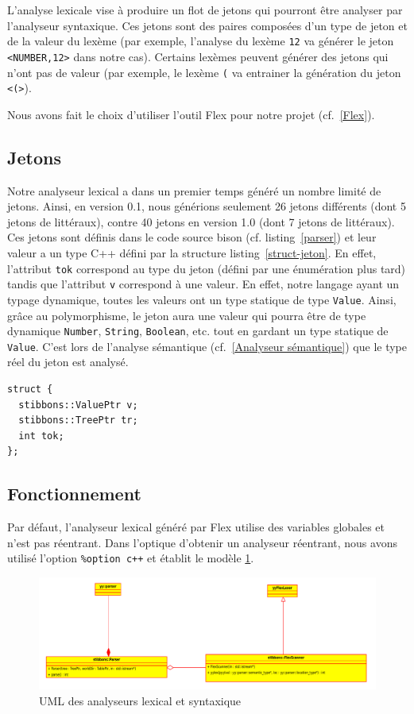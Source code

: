 L'analyse lexicale vise à produire un flot de jetons qui pourront être analyser par l'analyseur syntaxique. Ces jetons sont des paires composées d'un type de jeton et de la valeur du lexème (par exemple, l'analyse du lexème \verb|12| va générer le jeton \verb|<NUMBER,12>| dans notre cas). Certains lexèmes peuvent générer des jetons qui n'ont pas de valeur (par exemple, le lexème \verb|(| va entrainer la génération du jeton \verb|<(>|).

Nous avons fait le choix d'utiliser l'outil Flex pour notre projet (cf.~\ref{Flex}).

\subsection{Jetons}
Notre analyseur lexical a dans un premier temps généré un nombre limité de jetons. Ainsi, en version 0.1, nous générions seulement 26 jetons différents (dont 5 jetons de littéraux), contre 40 jetons en version 1.0 (dont 7 jetons de littéraux). Ces jetons sont définis dans le code source bison (cf. listing~\ref{parser}) et leur valeur a un type C++ défini par la structure listing~\ref{struct-jeton}. En effet, l'attribut \verb|tok| correspond au type du jeton (défini par une énumération plus tard) tandis que l'attribut \verb|v| correspond à une valeur. En effet, notre langage ayant un typage dynamique, toutes les valeurs ont un type statique de type \verb|Value|. Ainsi, grâce au polymorphisme, le jeton aura une valeur qui pourra être de type dynamique \verb|Number|, \verb|String|, \verb|Boolean|, etc. tout en gardant un type statique de \verb|Value|. C'est lors de l'analyse sémantique (cf.~\ref{Analyseur sémantique}) que le type réel du jeton est analysé.

\begin{lstlisting}[label=struct-jeton,caption=Type des valeurs des jetons]
struct {
  stibbons::ValuePtr v;
  stibbons::TreePtr tr;
  int tok;
};
\end{lstlisting}

\subsection{Fonctionnement}
Par défaut, l'analyseur lexical généré par Flex utilise des variables globales et n'est pas réentrant. Dans l'optique d'obtenir un analyseur réentrant, nous avons utilisé l'option \verb|%option c++| et établit le modèle \ref{uml-lexer}. 

\begin{figure}[h]
\centering
\includegraphics[scale=0.6]{doc/report/uml/reentrant-parser}
\caption{\label{uml-lexer} UML des analyseurs lexical et syntaxique}
\end{figure}

